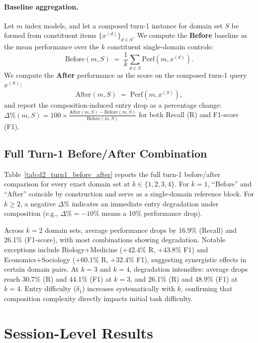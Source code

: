 \paragraph{Baseline aggregation.}
Let $m$ index models, and let a composed turn-1 instance for domain set $S$ be formed from constituent items $\{x^{(d)}\}_{d\in S}$. We compute the \textbf{Before} baseline as the mean performance over the $k$ constituent single-domain controls:
\begin{equation}
  \mathrm{Before}(m,S) \;=\; \frac{1}{k}\sum_{d\in S} \mathrm{Perf}\!\left(m, x^{(d)}\right).
  \label{eq:d2_before_mean}
\end{equation}
We compute the \textbf{After} performance as the score on the composed turn-1 query $x^{(S)}$:
\begin{equation}
  \mathrm{After}(m,S) \;=\; \mathrm{Perf}\!\left(m, x^{(S)}\right),
  \label{eq:d2_after}
\end{equation}
and report the composition-induced entry drop as a percentage change: $\Delta\%(m,S)=100 \times \frac{\mathrm{After}(m,S)-\mathrm{Before}(m,S)}{\mathrm{Before}(m,S)}$ for both Recall (R) and F1-score (F1).

\subsection{Full Turn-1 Before/After Combination}
Table~\ref{tab:d2_turn1_before_after} reports the full turn-1 before/after comparison for every exact domain set at $k\in\{1,2,3,4\}$. For $k{=}1$, ``Before'' and ``After'' coincide by construction and serve as a single-domain reference block. For $k\ge 2$, a negative $\Delta\%$ indicates an immediate entry degradation under composition (e.g., $\Delta\%=-10\%$ means a 10\% performance drop).

Across $k{=}2$ domain sets, average performance drops by 16.9\% (Recall) and 26.1\% (F1-score), with most combinations showing degradation. Notable exceptions include Biology+Medicine (+42.4\% R, +43.8\% F1) and Economics+Sociology (+60.1\% R, +32.4\% F1), suggesting synergistic effects in certain domain pairs. At $k{=}3$ and $k{=}4$, degradation intensifies: average drops reach 30.7\% (R) and 44.1\% (F1) at $k{=}3$, and 26.1\% (R) and 48.9\% (F1) at $k{=}4$. Entry difficulty ($\delta_1$) increases systematically with $k$, confirming that composition complexity directly impacts initial task difficulty.

\section{Session-Level Results}
\label{app:full_tables}

